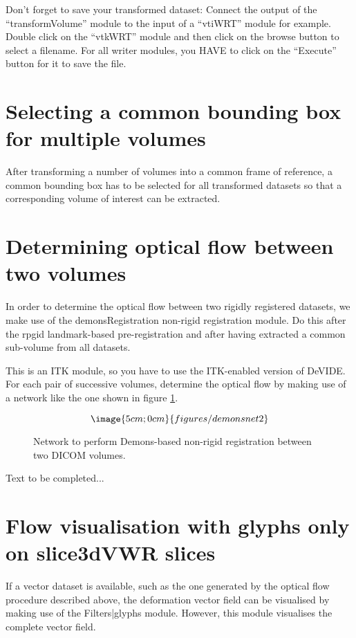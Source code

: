 Don't forget to save your transformed dataset:  Connect the output of the
``transformVolume'' module to the input of a ``vtiWRT'' module for
example.  Double click on the ``vtkWRT'' module and then click on the browse
button to select a filename.  For all writer modules, you HAVE to click on
the ``Execute'' button for it to save the file. 

\section{Selecting a common bounding box for multiple volumes}
After transforming a number of volumes into a common frame of
reference, a common bounding box has to be selected for all
transformed datasets so that a corresponding volume of interest can be
extracted.

\section{Determining optical flow between two volumes}
In order to determine the optical flow between two rigidly registered
datasets, we make use of the demonsRegistration non-rigid registration
module.  Do this after the rpgid landmark-based pre-registration and
after having extracted a common sub-volume from all datasets.

This is an ITK module, so you have to use the ITK-enabled version of
DeVIDE.  For each pair of successive volumes, determine the optical
flow by making use of a network like the one shown in figure
\ref{figdemons}.

\begin{figure}
$$\image{5cm;0cm}{figures/demonsnet2}$$
\caption{Network to perform Demons-based non-rigid registration between two 
DICOM volumes.}\label{figdemons}
\end{figure}

Text to be completed...

\section{Flow visualisation with glyphs only on slice3dVWR slices}

If a vector dataset is available, such as the one generated by the
optical flow procedure described above, the deformation vector field
can be visualised by making use of the Filters|glyphs module.
However, this module visualises the complete vector field.

